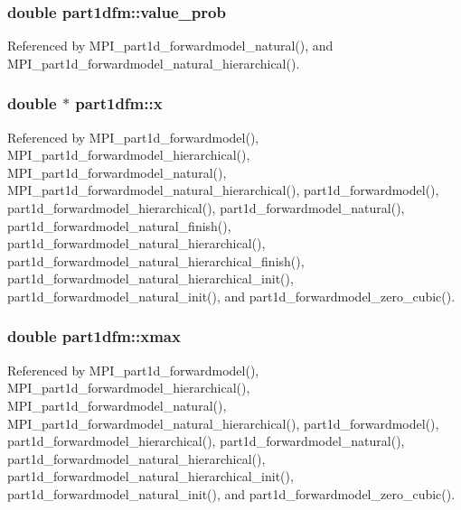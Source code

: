 \subsubsection[{\texorpdfstring{value\+\_\+prob}{value_prob}}]{\setlength{\rightskip}{0pt plus 5cm}double part1dfm\+::value\+\_\+prob}\hypertarget{structpart1dfm_a341b09254f4518ddb868f8979ccae238}{}\label{structpart1dfm_a341b09254f4518ddb868f8979ccae238}


Referenced by M\+P\+I\+\_\+part1d\+\_\+forwardmodel\+\_\+natural(), and M\+P\+I\+\_\+part1d\+\_\+forwardmodel\+\_\+natural\+\_\+hierarchical().

\subsubsection[{\texorpdfstring{x}{x}}]{\setlength{\rightskip}{0pt plus 5cm}double $\ast$ part1dfm\+::x}\hypertarget{structpart1dfm_a43c76d5f2756aca4d037e8d1f06e454f}{}\label{structpart1dfm_a43c76d5f2756aca4d037e8d1f06e454f}


Referenced by M\+P\+I\+\_\+part1d\+\_\+forwardmodel(), M\+P\+I\+\_\+part1d\+\_\+forwardmodel\+\_\+hierarchical(), M\+P\+I\+\_\+part1d\+\_\+forwardmodel\+\_\+natural(), M\+P\+I\+\_\+part1d\+\_\+forwardmodel\+\_\+natural\+\_\+hierarchical(), part1d\+\_\+forwardmodel(), part1d\+\_\+forwardmodel\+\_\+hierarchical(), part1d\+\_\+forwardmodel\+\_\+natural(), part1d\+\_\+forwardmodel\+\_\+natural\+\_\+finish(), part1d\+\_\+forwardmodel\+\_\+natural\+\_\+hierarchical(), part1d\+\_\+forwardmodel\+\_\+natural\+\_\+hierarchical\+\_\+finish(), part1d\+\_\+forwardmodel\+\_\+natural\+\_\+hierarchical\+\_\+init(), part1d\+\_\+forwardmodel\+\_\+natural\+\_\+init(), and part1d\+\_\+forwardmodel\+\_\+zero\+\_\+cubic().

\subsubsection[{\texorpdfstring{xmax}{xmax}}]{\setlength{\rightskip}{0pt plus 5cm}double part1dfm\+::xmax}\hypertarget{structpart1dfm_a96ead395f5c9aee43780a0b3af23419c}{}\label{structpart1dfm_a96ead395f5c9aee43780a0b3af23419c}


Referenced by M\+P\+I\+\_\+part1d\+\_\+forwardmodel(), M\+P\+I\+\_\+part1d\+\_\+forwardmodel\+\_\+hierarchical(), M\+P\+I\+\_\+part1d\+\_\+forwardmodel\+\_\+natural(), M\+P\+I\+\_\+part1d\+\_\+forwardmodel\+\_\+natural\+\_\+hierarchical(), part1d\+\_\+forwardmodel(), part1d\+\_\+forwardmodel\+\_\+hierarchical(), part1d\+\_\+forwardmodel\+\_\+natural(), part1d\+\_\+forwardmodel\+\_\+natural\+\_\+hierarchical(), part1d\+\_\+forwardmodel\+\_\+natural\+\_\+hierarchical\+\_\+init(), part1d\+\_\+forwardmodel\+\_\+natural\+\_\+init(), and part1d\+\_\+forwardmodel\+\_\+zero\+\_\+cubic().

